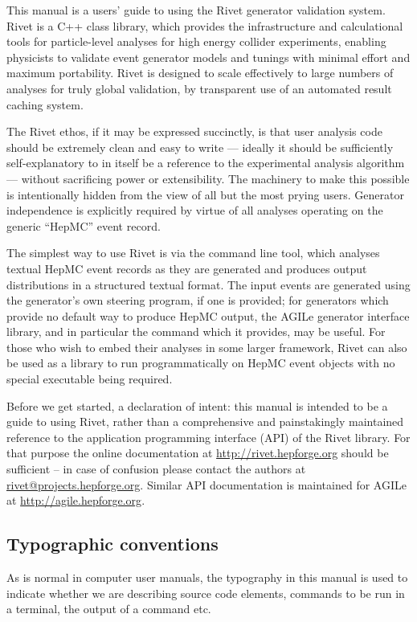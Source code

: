 This manual is a users' guide to using the Rivet generator validation
system. Rivet is a C++ class library, which provides the infrastructure and
calculational tools for particle-level analyses for high energy collider
experiments, enabling physicists to
validate event generator models and tunings with minimal effort and maximum
portability. Rivet is designed to scale effectively to large numbers of analyses
for truly global validation, by transparent use of an automated result caching
system.

The Rivet ethos, if it may be expressed succinctly, is that user analysis code
should be extremely clean and easy to write --- ideally it should be
sufficiently self-explanatory to in itself be a reference to the experimental
analysis algorithm --- without sacrificing power or extensibility. The machinery
to make this possible is intentionally hidden from the view of all but the most
prying users. Generator independence is explicitly required by virtue of all
analyses operating on the generic ``HepMC'' event record.

The simplest way to use Rivet is via the  command line tool, which
analyses textual HepMC event records as they are generated and produces output
distributions in a structured textual format. The input events are generated
using the generator's own steering program, if one is provided; for generators
which provide no default way to produce HepMC output, the AGILe generator
interface library, and in particular the  command which it
provides, may be useful. For those who wish to embed their analyses in some
larger framework, Rivet can also be used as a library to run programmatically
on HepMC event objects with no special executable being required.

Before we get started, a declaration of intent: this manual is intended to be a
guide to using Rivet, rather than a comprehensive and painstakingly maintained
reference to the application programming interface (API) of the Rivet
library. For that purpose the online documentation at
\url{http://rivet.hepforge.org} should be sufficient -- in case of confusion
please contact the authors at \url{rivet@projects.hepforge.org}. Similar API
documentation is maintained for AGILe at \url{http://agile.hepforge.org}.


\subsection{Typographic conventions}
As is normal in computer user manuals, the typography in this manual is used to
indicate whether we are describing source code elements, commands to be run in a
terminal, the output of a command etc.

